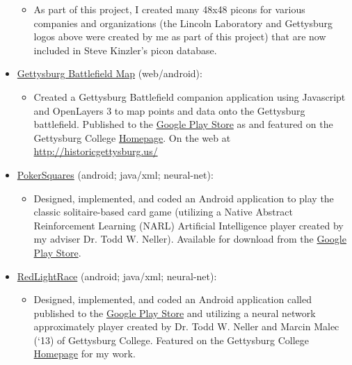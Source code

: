 \documentclass[11pt]{article}
\begin{document}
\begin{itemize}
\begin{itemize}
	\item As part of this project, I created many 48x48 picons for various companies and organizations (the Lincoln Laboratory and Gettysburg logos above were created by me as part of this project) that are now included in Steve Kinzler's picon database.
	\end{itemize}
	\item \href{https://github.com/JohnDDuncanIII/GettysburgMonumentsMap}{Gettysburg Battlefield Map} (web/android): 
	\begin{itemize}
	\item Created a Gettysburg Battlefield companion application using Javascript and OpenLayers 3 to map points and data onto the Gettysburg battlefield. Published to the \href{https://play.google.com/store/apps/details?id=edu.gettysburg.MonumentsMap}{Google Play Store} as  and featured on the Gettysburg College \href{http://www.gettysburg.edu/news_events/press_release_detail.dot?id=6bb9e711-cbbd-4c0d-98c8-ca379ebc5321}{Homepage}. On the web at \url{http://historicgettysburg.us/}
	\end{itemize}
	\item \href{https://github.com/JohnDDuncanIII/PokerSquares}{PokerSquares} (android; java/xml; neural-net): 
	\begin{itemize}
	\item Designed, implemented, and coded an Android application to play the classic solitaire-based card game  (utilizing a Native Abstract Reinforcement Learning (NARL) Artificial Intelligence player created by my adviser Dr. Todd W. Neller). Available for download from the \href{https://play.google.com/store/apps/details?id=edu.gettysburg.pokersquares}{Google Play Store}.
	\end{itemize}
	\item \href{https://github.com/JohnDDuncanIII/RedLightRace}{RedLightRace} (android; java/xml; neural-net): 
	\begin{itemize}
	\item Designed, implemented, and coded an Android application called  published to the \href{https://play.google.com/store/apps/details?id=edu.gettysburg.redlight}{Google Play Store} and utilizing a neural network approximately player created by Dr. Todd W. Neller and Marcin Malec (‘13) of Gettysburg College. Featured on the Gettysburg College \href{http://www.gettysburg.edu/news_events/press_release_detail.dot?id=16f6ea27-401c-42b2-bf77-c5c8ab319ee1}{Homepage} for my work.

\end{itemize}
\end{itemize}
\end{document}
